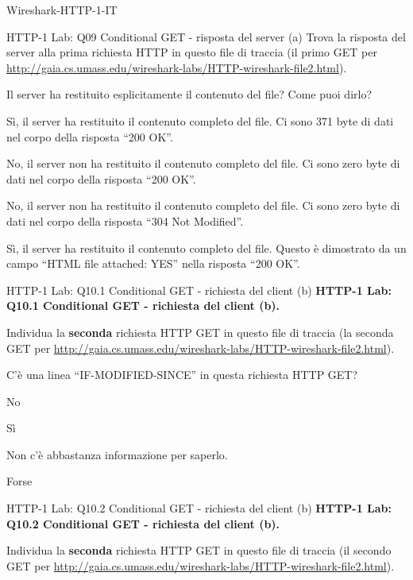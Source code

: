 \documentclass[a4paper]{article}
\begin{document}
\begin{quiz}{Wireshark-HTTP-1-IT}
\begin{multi}[points=1,shuffle]{HTTP-1 Lab: Q09 Conditional GET - risposta del server (a)}
Trova la risposta del server alla prima richiesta HTTP in questo file di traccia (il primo GET per \href{http://gaia.cs.umass.edu/wireshark-labs/HTTP-wireshark-file2.html}{http://gaia.cs.umass.edu/wireshark-labs/HTTP-wireshark-file2.html}).

Il server ha restituito esplicitamente il contenuto del file? Come puoi dirlo? 
\item* Sì, il server ha restituito il contenuto completo del file. Ci sono 371 byte di dati nel corpo della risposta ``200 OK''.
\item No, il server non ha restituito il contenuto completo del file. Ci sono zero byte di dati nel corpo della risposta ``200 OK''.
\item No, il server non ha restituito il contenuto completo del file. Ci sono zero byte di dati nel corpo della risposta ``304 Not Modified''.
\item Sì, il server ha restituito il contenuto completo del file. Questo è dimostrato da un campo ``HTML file attached: YES'' nella risposta ``200 OK''.
\end{multi}

\begin{multi}[points=1,shuffle]{HTTP-1 Lab: Q10.1 Conditional GET - richiesta del client (b)}
\textbf{HTTP-1 Lab: Q10.1 Conditional GET - richiesta del client (b).} 

Individua la \textbf{seconda} richiesta HTTP GET in questo file di traccia (la seconda GET per \href{http://gaia.cs.umass.edu/wireshark-labs/HTTP-wireshark-file2.html}{http://gaia.cs.umass.edu/wireshark-labs/HTTP-wireshark-file2.html}).

C'è una linea ``IF-MODIFIED-SINCE'' in questa richiesta HTTP GET?
\item No
\item* Sì
\item Non c'è abbastanza informazione per saperlo.
\item Forse
\end{multi}

\begin{multi}[points=1,shuffle]{HTTP-1 Lab: Q10.2 Conditional GET - richiesta del client (b)}
\textbf{HTTP-1 Lab: Q10.2 Conditional GET - richiesta del client (b).} 

Individua la \textbf{seconda} richiesta HTTP GET in questo file di traccia (il secondo GET per \href{http://gaia.cs.umass.edu/wireshark-labs/HTTP-wireshark-file2.html}{http://gaia.cs.umass.edu/wireshark-labs/HTTP-wireshark-file2.html}).


\end{multi}
\end{quiz}
\end{document}
